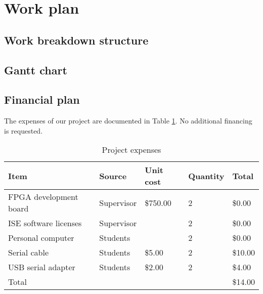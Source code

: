 \section{Work plan}

\subsection{Work breakdown structure} %



\subsection{Gantt chart} %



\subsection{Financial plan} %


The expenses of our project are documented in Table \ref{expenses-table}.
No additional financing is requested.

\begin{table}[h!]
	\centering
	\begin{tabular}{ | l | l | l | l | l | }
		\hline
		\textbf{Item} & \textbf{Source} & \textbf{Unit cost} & \textbf{Quantity} & \textbf{Total} \\
		\hline \hline
		FPGA development board & Supervisor & \$750.00 & 2 & \$0.00 \\
		ISE software licenses & Supervisor & & 2 & \$0.00 \\
		Personal computer & Students & & 2 & \$0.00 \\
		Serial cable & Students & \$5.00 & 2 & \$10.00 \\
		USB serial adapter & Students & \$2.00 & 2 & \$4.00 \\
		\hline
		Total & & & & \$14.00 \\
		\hline
	\end{tabular}
	\caption{Project expenses}
	\label{expenses-table}
\end{table}


